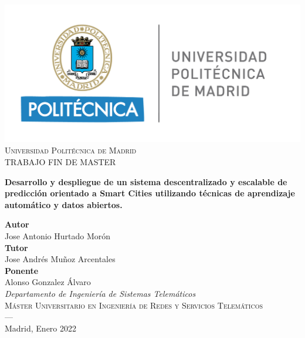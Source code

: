\begin{titlepage}



\setlength{\centeroffset}{-0.5\oddsidemargin}
\addtolength{\centeroffset}{0.5\evensidemargin}
\thispagestyle{empty}

\noindent\hspace*{\centeroffset}
\begin{minipage}{\textwidth}

\centering
\includegraphics[scale=0.6]{imagenes/upm.png}\\[1.4cm]

\textsc{ Universidad Politécnica de Madrid\\[0.2cm]}
\textsc{ \Large TRABAJO FIN DE MASTER\\[0.2cm]}

%
{\Large \bfseries  Desarrollo y despliegue de un sistema descentralizado y escalable de predicción orientado a Smart Cities utilizando técnicas de aprendizaje automático y datos abiertos.\\
}
\end{minipage}

\vspace{2cm}
\noindent\hspace*{\centeroffset}\begin{minipage}{\textwidth}
\centering

\textbf{Autor}\\ {Jose Antonio Hurtado Morón}\\[2.5ex]
\textbf{Tutor}\\ {Jose Andrés Muñoz Arcentales}\\[2ex]
\textbf{Ponente}\\{Alonso Gonzalez Álvaro}\\[2cm]
\textit{Departamento de Ingeniería de Sistemas Telemáticos} \\
\textsc{Máster Universitario en Ingeniería de Redes y Servicios Telemáticos}\\[1cm]
\textsc{---}\\
Madrid, Enero 2022
\end{minipage}
\end{titlepage}


